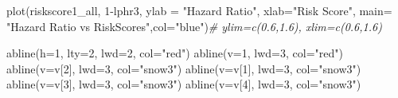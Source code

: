 \documentclass[
  11pt,
]{article}
\newenvironment{Shaded}{\begin{snugshade}}{\end{snugshade}}
\newcommand{\AttributeTok}[1]{\textcolor[rgb]{0.77,0.63,0.00}{#1}}
\newcommand{\CommentTok}[1]{\textcolor[rgb]{0.56,0.35,0.01}{\textit{#1}}}
\newcommand{\DecValTok}[1]{\textcolor[rgb]{0.00,0.00,0.81}{#1}}
\newcommand{\FunctionTok}[1]{\textcolor[rgb]{0.00,0.00,0.00}{#1}}
\newcommand{\NormalTok}[1]{#1}
\newcommand{\SpecialCharTok}[1]{\textcolor[rgb]{0.00,0.00,0.00}{#1}}
\newcommand{\StringTok}[1]{\textcolor[rgb]{0.31,0.60,0.02}{#1}}
\begin{document}
\begin{Shaded}
\begin{Highlighting}[]
\FunctionTok{plot}\NormalTok{(riskscore1\_all, }\DecValTok{1}\SpecialCharTok{{-}}\NormalTok{lphr3, }\AttributeTok{ylab =} \StringTok{"Hazard Ratio"}\NormalTok{, }\AttributeTok{xlab=}\StringTok{"Risk Score"}\NormalTok{,}
     \AttributeTok{main=} \StringTok{"Hazard Ratio vs RiskScores"}\NormalTok{,}\AttributeTok{col=}\StringTok{"blue"}\NormalTok{)}\CommentTok{\# ylim=c(0.6,1.6), xlim=c(0.6,1.6)}

\FunctionTok{abline}\NormalTok{(}\AttributeTok{h=}\DecValTok{1}\NormalTok{, }\AttributeTok{lty=}\DecValTok{2}\NormalTok{, }\AttributeTok{lwd=}\DecValTok{2}\NormalTok{, }\AttributeTok{col=}\StringTok{"red"}\NormalTok{)}
\FunctionTok{abline}\NormalTok{(}\AttributeTok{v=}\DecValTok{1}\NormalTok{, }\AttributeTok{lwd=}\DecValTok{3}\NormalTok{, }\AttributeTok{col=}\StringTok{"red"}\NormalTok{)}
\FunctionTok{abline}\NormalTok{(}\AttributeTok{v=}\NormalTok{v[}\DecValTok{2}\NormalTok{], }\AttributeTok{lwd=}\DecValTok{3}\NormalTok{, }\AttributeTok{col=}\StringTok{"snow3"}\NormalTok{)}
\FunctionTok{abline}\NormalTok{(}\AttributeTok{v=}\NormalTok{v[}\DecValTok{1}\NormalTok{], }\AttributeTok{lwd=}\DecValTok{3}\NormalTok{, }\AttributeTok{col=}\StringTok{"snow3"}\NormalTok{)}
\FunctionTok{abline}\NormalTok{(}\AttributeTok{v=}\NormalTok{v[}\DecValTok{3}\NormalTok{], }\AttributeTok{lwd=}\DecValTok{3}\NormalTok{, }\AttributeTok{col=}\StringTok{"snow3"}\NormalTok{)}
\FunctionTok{abline}\NormalTok{(}\AttributeTok{v=}\NormalTok{v[}\DecValTok{4}\NormalTok{], }\AttributeTok{lwd=}\DecValTok{3}\NormalTok{, }\AttributeTok{col=}\StringTok{"snow3"}\NormalTok{)}
\end{Highlighting}
\end{Shaded}
\end{document}
